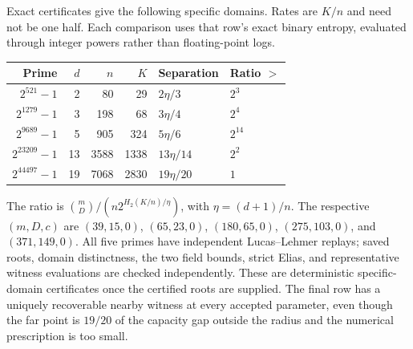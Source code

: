 Exact certificates give the following specific domains. Rates are $K/n$
and need not be one half. Each comparison uses that row's exact binary
entropy, evaluated through integer powers rather than floating-point logs.
\begin{center}
\begin{tabular}{@{}rrrrll@{}}
\toprule
Prime & $d$ & $n$ & $K$ & Separation & Ratio $>$\\
\midrule
$2^{521}-1$&2&80&29&$2\eta/3$&$2^3$\\
$2^{1279}-1$&3&198&68&$3\eta/4$&$2^4$\\
$2^{9689}-1$&5&905&324&$5\eta/6$&$2^{14}$\\
$2^{23209}-1$&13&3588&1338&$13\eta/14$&$2^2$\\
$2^{44497}-1$&19&7068&2830&$19\eta/20$&$1$\\
\bottomrule
\end{tabular}
\end{center}
The ratio is $\binom mD/(n2^{H_2(K/n)/\eta})$, with
$\eta=(d+1)/n$. The respective $(m,D,c)$ are
$(39,15,0)$, $(65,23,0)$, $(180,65,0)$, $(275,103,0)$,
and $(371,149,0)$.
All five primes have independent Lucas--Lehmer replays; saved roots,
domain distinctness, the two field bounds, strict Elias, and representative
witness evaluations are checked independently. These are deterministic
specific-domain certificates once the certified roots are supplied.
The final row has a uniquely recoverable nearby witness at every accepted
parameter, even though the far point is $19/20$ of the capacity gap
outside the radius and the numerical prescription is too small.
